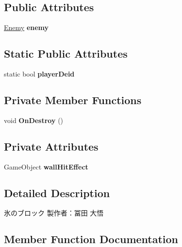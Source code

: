 \subsection*{Public Attributes}
\begin{DoxyCompactItemize}
\item 
\mbox{\label{class_block_obj_a4aca3a097e3cd1075362c3e9f4567f5e}} 
\hyperlink{class_enemy}{Enemy} {\bfseries enemy}
\end{DoxyCompactItemize}
\subsection*{Static Public Attributes}
\begin{DoxyCompactItemize}
\item 
\mbox{\label{class_block_obj_a7876e87b728de3765b19a6d6a7a36b26}} 
static bool {\bfseries player\+Deid}
\end{DoxyCompactItemize}
\subsection*{Private Member Functions}
\begin{DoxyCompactItemize}
\item 
\mbox{\label{class_block_obj_a4ddcb2f40eb1726f19f52f60d0e63e05}} 
void {\bfseries On\+Destroy} ()
\end{DoxyCompactItemize}
\subsection*{Private Attributes}
\begin{DoxyCompactItemize}
\item 
\mbox{\label{class_block_obj_aafd87dfd9d9dd9103cca5c554eb40ebb}} 
Game\+Object {\bfseries wall\+Hit\+Effect}
\end{DoxyCompactItemize}


\subsection{Detailed Description}
氷のブロック 製作者：冨田 大悟 



\subsection{Member Function Documentation}
\mbox{\label{class_block_obj_aed25d6e080bf90d5375c8c9807584f8d}} 
